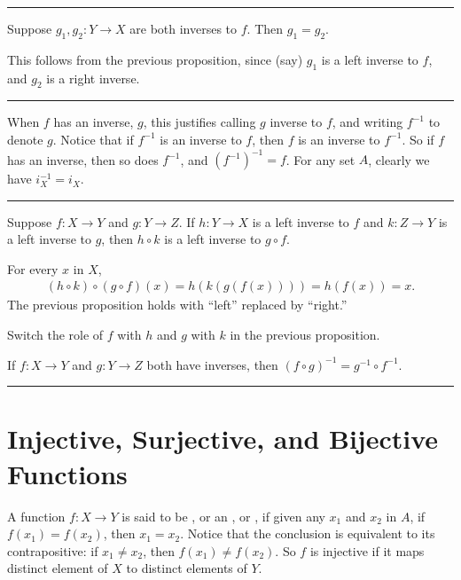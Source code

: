 \documentclass[letterpaper,10pt,english]{sphinxmanual}
\begin{document}
\bigskip\hrule\bigskip


\sphinxAtStartPar
{} Suppose \(g_1, g_2 : Y \to X\) are both inverses to \(f\). Then \(g_1 = g_2\).

\sphinxAtStartPar
{} This follows from the previous proposition, since (say) \(g_1\) is a left inverse to \(f\), and \(g_2\) is a right inverse.


\bigskip\hrule\bigskip


\sphinxAtStartPar
When \(f\) has an inverse, \(g\), this justifies calling \(g\)  inverse to \(f\), and writing \(f^{-1}\) to denote \(g\). Notice that if \(f^{-1}\) is an inverse to \(f\), then \(f\) is an inverse to \(f^{-1}\). So if \(f\) has an inverse, then so does \(f^{-1}\), and \((f^{-1})^{-1} = f\). For any set \(A\), clearly we have \(i_X^{-1} = i_X\).


\bigskip\hrule\bigskip


\sphinxAtStartPar
{} Suppose \(f : X \to Y\) and \(g : Y \to Z\). If \(h : Y \to X\) is a left inverse to \(f\) and \(k : Z \to Y\) is a left inverse to \(g\), then \(h \circ k\) is a left inverse to \(g \circ f\).

\sphinxAtStartPar
{} For every \(x\) in \(X\),
\begin{equation*}
\begin{split}(h \circ k) \circ (g \circ f) (x) = h(k(g(f(x)))) = h(f(x)) = x.\end{split}
\end{equation*}
\sphinxAtStartPar
{} The previous proposition holds with “left” replaced by “right.”

\sphinxAtStartPar
{} Switch the role of \(f\) with \(h\) and \(g\) with \(k\) in the previous proposition.

\sphinxAtStartPar
{} If \(f : X \to Y\) and \(g : Y \to Z\) both have inverses, then \((f \circ g)^{-1} = g^{-1} \circ f^{-1}\).


\bigskip\hrule\bigskip



\section{Injective, Surjective, and Bijective Functions}
\label{\detokenize{functions:injective-surjective-and-bijective-functions}}\label{\detokenize{functions:id2}}
\sphinxAtStartPar
A function \(f : X \to Y\) is said to be , or an , or , if given any \(x_1\) and \(x_2\) in \(A\), if \(f(x_1) = f(x_2)\), then \(x_1 = x_2\). Notice that the conclusion is equivalent to its contrapositive: if \(x_1 \neq x_2\), then \(f(x_1) \neq f(x_2)\). So \(f\) is injective if it maps distinct element of \(X\) to distinct elements of \(Y\).
\end{document}
